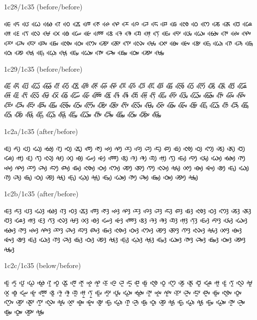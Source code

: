 \noindent
1c28/1c35 (before/before)

\noindent
ᰀᰨᰵ ᰁᰨᰵ ᰂᰨᰵ ᰃᰨᰵ ᰄᰨᰵ ᰅᰨᰵ ᰆᰨᰵ ᰇᰨᰵ ᰈᰨᰵ ᰉᰨᰵ ᰊᰨᰵ ᰋᰨᰵ ᰌᰨᰵ ᰍᰨᰵ ᰎᰨᰵ ᰏᰨᰵ ᰐᰨᰵ ᰑᰨᰵ ᰒᰨᰵ ᰓᰨᰵ ᰔᰨᰵ ᰕᰨᰵ ᰖᰨᰵ ᰗᰨᰵ ᰘᰨᰵ ᰙᰨᰵ ᰚᰨᰵ ᰛᰨᰵ ᰜᰨᰵ ᰝᰨᰵ ᰞᰨᰵ ᰟᰨᰵ ᰠᰨᰵ ᰡᰨᰵ ᰢᰨᰵ ᰣᰨᰵ ᱍᰨᰵ ᱎᰨᰵ ᱏᰨᰵ ᰙ᰷ᰨᰵ ᰛ᰷ᰨᰵ ᰀᰤᰨᰵ ᰁᰤᰨᰵ ᰂᰤᰨᰵ ᰃᰤᰨᰵ ᰄᰤᰨᰵ ᰅᰤᰨᰵ ᰊᰤᰨᰵ ᰋᰤᰨᰵ ᰌᰤᰨᰵ ᰎᰤᰨᰵ ᰏᰤᰨᰵ ᰐᰤᰨᰵ ᰑᰤᰨᰵ ᰒᰤᰨᰵ ᰓᰤᰨᰵ ᰔᰤᰨᰵ ᰕᰤᰨᰵ ᰖᰤᰨᰵ ᰛᰤᰨᰵ ᰜᰤᰨᰵ ᰝᰤᰨᰵ ᰞᰤᰨᰵ ᰟᰤᰨᰵ ᰡᰤᰨᰵ ᰣᰤᰨᰵ ᰀᰥᰨᰵ ᰃᰥᰨᰵ ᰅᰥᰨᰵ ᰎᰥᰨᰵ ᰑᰥᰨᰵ ᰓᰥᰨᰵ ᰕᰥᰨᰵ ᰝᰥᰨᰵ ᰀ᰷ᰥᰨᰵ ᰃ᰷ᰥᰨᰵ ᰝ᰷ᰥᰨᰵ ᰀᰥᰤᰨᰵ ᰃᰥᰤᰨᰵ ᰅᰥᰤᰨᰵ ᰎᰥᰤᰨᰵ ᰑᰥᰤᰨᰵ ᰓᰥᰤᰨᰵ ᰕᰥᰤᰨᰵ ᰝᰥᰤᰨᰵ 

\noindent
1c29/1c35 (before/before)

\noindent
ᰀᰩᰵ ᰁᰩᰵ ᰂᰩᰵ ᰃᰩᰵ ᰄᰩᰵ ᰅᰩᰵ ᰆᰩᰵ ᰇᰩᰵ ᰈᰩᰵ ᰉᰩᰵ ᰊᰩᰵ ᰋᰩᰵ ᰌᰩᰵ ᰍᰩᰵ ᰎᰩᰵ ᰏᰩᰵ ᰐᰩᰵ ᰑᰩᰵ ᰒᰩᰵ ᰓᰩᰵ ᰔᰩᰵ ᰕᰩᰵ ᰖᰩᰵ ᰗᰩᰵ ᰘᰩᰵ ᰙᰩᰵ ᰚᰩᰵ ᰛᰩᰵ ᰜᰩᰵ ᰝᰩᰵ ᰞᰩᰵ ᰟᰩᰵ ᰠᰩᰵ ᰡᰩᰵ ᰢᰩᰵ ᰣᰩᰵ ᱍᰩᰵ ᱎᰩᰵ ᱏᰩᰵ ᰙ᰷ᰩᰵ ᰛ᰷ᰩᰵ ᰀᰤᰩᰵ ᰁᰤᰩᰵ ᰂᰤᰩᰵ ᰃᰤᰩᰵ ᰄᰤᰩᰵ ᰅᰤᰩᰵ ᰊᰤᰩᰵ ᰋᰤᰩᰵ ᰌᰤᰩᰵ ᰎᰤᰩᰵ ᰏᰤᰩᰵ ᰐᰤᰩᰵ ᰑᰤᰩᰵ ᰒᰤᰩᰵ ᰓᰤᰩᰵ ᰔᰤᰩᰵ ᰕᰤᰩᰵ ᰖᰤᰩᰵ ᰛᰤᰩᰵ ᰜᰤᰩᰵ ᰝᰤᰩᰵ ᰞᰤᰩᰵ ᰟᰤᰩᰵ ᰡᰤᰩᰵ ᰣᰤᰩᰵ ᰀᰥᰩᰵ ᰃᰥᰩᰵ ᰅᰥᰩᰵ ᰎᰥᰩᰵ ᰑᰥᰩᰵ ᰓᰥᰩᰵ ᰕᰥᰩᰵ ᰝᰥᰩᰵ ᰀ᰷ᰥᰩᰵ ᰃ᰷ᰥᰩᰵ ᰝ᰷ᰥᰩᰵ ᰀᰥᰤᰩᰵ ᰃᰥᰤᰩᰵ ᰅᰥᰤᰩᰵ ᰎᰥᰤᰩᰵ ᰑᰥᰤᰩᰵ ᰓᰥᰤᰩᰵ ᰕᰥᰤᰩᰵ ᰝᰥᰤᰩᰵ 

\noindent
1c2a/1c35 (after/before)

\noindent
ᰀᰪᰵ ᰁᰪᰵ ᰂᰪᰵ ᰃᰪᰵ ᰄᰪᰵ ᰅᰪᰵ ᰆᰪᰵ ᰇᰪᰵ ᰈᰪᰵ ᰉᰪᰵ ᰊᰪᰵ ᰋᰪᰵ ᰌᰪᰵ ᰍᰪᰵ ᰎᰪᰵ ᰏᰪᰵ ᰐᰪᰵ ᰑᰪᰵ ᰒᰪᰵ ᰓᰪᰵ ᰔᰪᰵ ᰕᰪᰵ ᰖᰪᰵ ᰗᰪᰵ ᰘᰪᰵ ᰙᰪᰵ ᰚᰪᰵ ᰛᰪᰵ ᰜᰪᰵ ᰝᰪᰵ ᰞᰪᰵ ᰟᰪᰵ ᰠᰪᰵ ᰡᰪᰵ ᰢᰪᰵ ᰣᰪᰵ ᱍᰪᰵ ᱎᰪᰵ ᱏᰪᰵ ᰙ᰷ᰪᰵ ᰛ᰷ᰪᰵ ᰀᰤᰪᰵ ᰁᰤᰪᰵ ᰂᰤᰪᰵ ᰃᰤᰪᰵ ᰄᰤᰪᰵ ᰅᰤᰪᰵ ᰊᰤᰪᰵ ᰋᰤᰪᰵ ᰌᰤᰪᰵ ᰎᰤᰪᰵ ᰏᰤᰪᰵ ᰐᰤᰪᰵ ᰑᰤᰪᰵ ᰒᰤᰪᰵ ᰓᰤᰪᰵ ᰔᰤᰪᰵ ᰕᰤᰪᰵ ᰖᰤᰪᰵ ᰛᰤᰪᰵ ᰜᰤᰪᰵ ᰝᰤᰪᰵ ᰞᰤᰪᰵ ᰟᰤᰪᰵ ᰡᰤᰪᰵ ᰣᰤᰪᰵ ᰀᰥᰪᰵ ᰃᰥᰪᰵ ᰅᰥᰪᰵ ᰎᰥᰪᰵ ᰑᰥᰪᰵ ᰓᰥᰪᰵ ᰕᰥᰪᰵ ᰝᰥᰪᰵ ᰀ᰷ᰥᰪᰵ ᰃ᰷ᰥᰪᰵ ᰝ᰷ᰥᰪᰵ ᰀᰥᰤᰪᰵ ᰃᰥᰤᰪᰵ ᰅᰥᰤᰪᰵ ᰎᰥᰤᰪᰵ ᰑᰥᰤᰪᰵ ᰓᰥᰤᰪᰵ ᰕᰥᰤᰪᰵ ᰝᰥᰤᰪᰵ 

\noindent
1c2b/1c35 (after/before)

\noindent
ᰀᰫᰵ ᰁᰫᰵ ᰂᰫᰵ ᰃᰫᰵ ᰄᰫᰵ ᰅᰫᰵ ᰆᰫᰵ ᰇᰫᰵ ᰈᰫᰵ ᰉᰫᰵ ᰊᰫᰵ ᰋᰫᰵ ᰌᰫᰵ ᰍᰫᰵ ᰎᰫᰵ ᰏᰫᰵ ᰐᰫᰵ ᰑᰫᰵ ᰒᰫᰵ ᰓᰫᰵ ᰔᰫᰵ ᰕᰫᰵ ᰖᰫᰵ ᰗᰫᰵ ᰘᰫᰵ ᰙᰫᰵ ᰚᰫᰵ ᰛᰫᰵ ᰜᰫᰵ ᰝᰫᰵ ᰞᰫᰵ ᰟᰫᰵ ᰠᰫᰵ ᰡᰫᰵ ᰢᰫᰵ ᰣᰫᰵ ᱍᰫᰵ ᱎᰫᰵ ᱏᰫᰵ ᰙ᰷ᰫᰵ ᰛ᰷ᰫᰵ ᰀᰤᰫᰵ ᰁᰤᰫᰵ ᰂᰤᰫᰵ ᰃᰤᰫᰵ ᰄᰤᰫᰵ ᰅᰤᰫᰵ ᰊᰤᰫᰵ ᰋᰤᰫᰵ ᰌᰤᰫᰵ ᰎᰤᰫᰵ ᰏᰤᰫᰵ ᰐᰤᰫᰵ ᰑᰤᰫᰵ ᰒᰤᰫᰵ ᰓᰤᰫᰵ ᰔᰤᰫᰵ ᰕᰤᰫᰵ ᰖᰤᰫᰵ ᰛᰤᰫᰵ ᰜᰤᰫᰵ ᰝᰤᰫᰵ ᰞᰤᰫᰵ ᰟᰤᰫᰵ ᰡᰤᰫᰵ ᰣᰤᰫᰵ ᰀᰥᰫᰵ ᰃᰥᰫᰵ ᰅᰥᰫᰵ ᰎᰥᰫᰵ ᰑᰥᰫᰵ ᰓᰥᰫᰵ ᰕᰥᰫᰵ ᰝᰥᰫᰵ ᰀ᰷ᰥᰫᰵ ᰃ᰷ᰥᰫᰵ ᰝ᰷ᰥᰫᰵ ᰀᰥᰤᰫᰵ ᰃᰥᰤᰫᰵ ᰅᰥᰤᰫᰵ ᰎᰥᰤᰫᰵ ᰑᰥᰤᰫᰵ ᰓᰥᰤᰫᰵ ᰕᰥᰤᰫᰵ ᰝᰥᰤᰫᰵ 

\noindent
1c2c/1c35 (below/before)

\noindent
ᰀᰬᰵ ᰁᰬᰵ ᰂᰬᰵ ᰃᰬᰵ ᰄᰬᰵ ᰅᰬᰵ ᰆᰬᰵ ᰇᰬᰵ ᰈᰬᰵ ᰉᰬᰵ ᰊᰬᰵ ᰋᰬᰵ ᰌᰬᰵ ᰍᰬᰵ ᰎᰬᰵ ᰏᰬᰵ ᰐᰬᰵ ᰑᰬᰵ ᰒᰬᰵ ᰓᰬᰵ ᰔᰬᰵ ᰕᰬᰵ ᰖᰬᰵ ᰗᰬᰵ ᰘᰬᰵ ᰙᰬᰵ ᰚᰬᰵ ᰛᰬᰵ ᰜᰬᰵ ᰝᰬᰵ ᰞᰬᰵ ᰟᰬᰵ ᰠᰬᰵ ᰡᰬᰵ ᰢᰬᰵ ᰣᰬᰵ ᱍᰬᰵ ᱎᰬᰵ ᱏᰬᰵ ᰙ᰷ᰬᰵ ᰛ᰷ᰬᰵ ᰀᰤᰬᰵ ᰁᰤᰬᰵ ᰂᰤᰬᰵ ᰃᰤᰬᰵ ᰄᰤᰬᰵ ᰅᰤᰬᰵ ᰊᰤᰬᰵ ᰋᰤᰬᰵ ᰌᰤᰬᰵ ᰎᰤᰬᰵ ᰏᰤᰬᰵ ᰐᰤᰬᰵ ᰑᰤᰬᰵ ᰒᰤᰬᰵ ᰓᰤᰬᰵ ᰔᰤᰬᰵ ᰕᰤᰬᰵ ᰖᰤᰬᰵ ᰛᰤᰬᰵ ᰜᰤᰬᰵ ᰝᰤᰬᰵ ᰞᰤᰬᰵ ᰟᰤᰬᰵ ᰡᰤᰬᰵ ᰣᰤᰬᰵ ᰀᰥᰬᰵ ᰃᰥᰬᰵ ᰅᰥᰬᰵ ᰎᰥᰬᰵ ᰑᰥᰬᰵ ᰓᰥᰬᰵ ᰕᰥᰬᰵ ᰝᰥᰬᰵ ᰀ᰷ᰥᰬᰵ ᰃ᰷ᰥᰬᰵ ᰝ᰷ᰥᰬᰵ ᰀᰥᰤᰬᰵ ᰃᰥᰤᰬᰵ ᰅᰥᰤᰬᰵ ᰎᰥᰤᰬᰵ ᰑᰥᰤᰬᰵ ᰓᰥᰤᰬᰵ ᰕᰥᰤᰬᰵ ᰝᰥᰤᰬᰵ 

